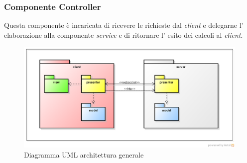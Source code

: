 \subsubsection{Componente Controller}
Questa componente è incaricata di ricevere le richieste dal \textit{client} e delegarne l' elaborazione alla componente \textit{service} e di ritornare l' esito dei calcoli al \textit{client}.
\begin{figure}[H] \centering \includegraphics[width=%
\textwidth]
{./other/MVPIntroduzione.png} \caption{Diagramma UML architettura generale}
\end{figure}